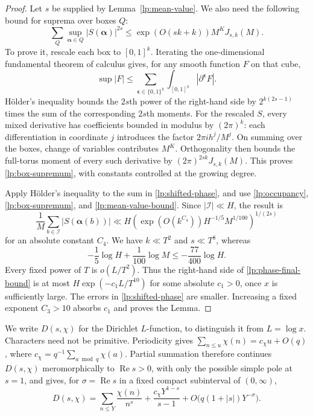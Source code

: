 \begin{proof}
Let $s$ be supplied by Lemma~\ref{lp:mean-value}.  We also need the
following bound for suprema over boxes $Q$:
\begin{equation}\label{lp:box-supremum}
 \sum_Q\sup_{\boldsymbol\alpha\in Q}|S(\boldsymbol\alpha)|^{2s}
 \le\exp(O(sk+k))M^KJ_{s,k}(M).
\end{equation}
To prove it, rescale each box to $[0,1]^k$.  Iterating the
one-dimensional fundamental theorem of calculus gives, for any smooth
function $F$ on that cube,
\[
 \sup|F|\le\sum_{\boldsymbol\epsilon\in\{0,1\}^k}
       \int_{[0,1]^k}|\partial^{\boldsymbol\epsilon}F|.
\]
H\"older's inequality bounds the $2s$th power of the right-hand side
by $2^{k(2s-1)}$ times the sum of the corresponding $2s$th moments.
For the rescaled $S$, every mixed derivative has coefficients bounded
in modulus by $(2\pi)^k$: each differentiation in coordinate $j$
introduces the factor $2\pi i h^j/M^j$.
On summing over the boxes, change of variables contributes $M^K$.
Orthogonality then bounds the full-torus moment of every such derivative
by $(2\pi)^{2sk}J_{s,k}(M)$.  This proves
\eqref{lp:box-supremum}, with constants controlled at the growing degree.

Apply H\"older's inequality to the sum in
\eqref{lp:shifted-phase}, and use \eqref{lp:occupancy},
\eqref{lp:box-supremum}, and \eqref{lp:mean-value-bound}.  Since
$|\mathcal I|\ll H$, the result is
\begin{equation}\label{lp:phase-final-bound}
 \frac1M\sum_{b\in\mathcal I}|S(\boldsymbol\alpha(b))|
 \ll H\left(\exp(O(k^{C_4}))H^{-1/5}M^{1/100}\right)^{1/(2s)}
\end{equation}
for an absolute constant $C_4$.
We have $k\ll T^2$ and $s\ll T^8$, whereas
\[
 -\frac15\log H+\frac1{100}\log M
       \le-\frac{77}{400}\log H.
\]
Every fixed power of $T$ is $o(L/T^2)$.  Thus the right-hand side
of \eqref{lp:phase-final-bound} is at most
$H\exp(-c_1L/T^{10})$ for some absolute $c_1>0$, once $x$ is
sufficiently large.  The errors in \eqref{lp:shifted-phase} are smaller.
Increasing a fixed exponent $C_3>10$ absorbs $c_1$ and proves the Lemma.
\end{proof}

We write $D(s,\chi)$ for the Dirichlet $L$-function, to distinguish it
from $L=\log x$.  Characters need not be primitive.  Periodicity gives
$\sum_{n\le u}\chi(n)=c_\chi u+O(q)$, where
$c_\chi=q^{-1}\sum_{a\bmod q}\chi(a)$.  Partial summation therefore
continues $D(s,\chi)$ meromorphically to $\operatorname{Re}s>0$, with
only the possible simple pole at $s=1$, and gives, for
$\sigma=\operatorname{Re}s$ in a fixed compact subinterval of $(0,\infty)$,
\begin{equation}\label{lp:L-tail}
 D(s,\chi)=\sum_{n\le Y}\frac{\chi(n)}{n^s}
       +\frac{c_\chi Y^{1-s}}{s-1}
       +O\bigl(q(1+|s|)Y^{-\sigma}\bigr).
\end{equation}

